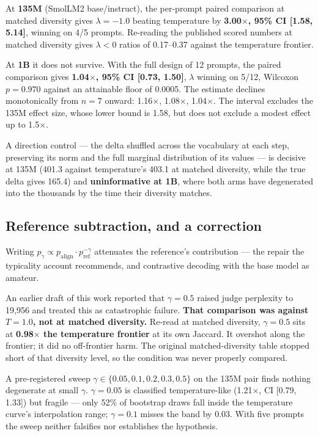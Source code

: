 \documentclass[11pt]{article}
\begin{document}
At \textbf{135M} (SmolLM2 base/instruct), the per-prompt paired comparison at
matched diversity gives $\lambda = -1.0$ beating temperature by
\textbf{3.00$\times$, 95\% CI [1.58, 5.14]}, winning on 4/5 prompts. Re-reading the
published scored numbers at matched diversity gives $\lambda < 0$ ratios of
0.17--0.37 against the temperature frontier.

At \textbf{1B} it does not survive. With the full design of 12 prompts, the paired
comparison gives \textbf{1.04$\times$, 95\% CI [0.73, 1.50]}, $\lambda$ winning on
5/12, Wilcoxon $p = 0.970$ against an attainable floor of 0.0005. The estimate
declines monotonically from $n = 7$ onward: 1.16$\times$, 1.08$\times$,
1.04$\times$. The interval excludes the 135M effect size, whose lower bound is
1.58, but does not exclude a modest effect up to 1.5$\times$.

A direction control --- the delta shuffled across the vocabulary at each step,
preserving its norm and the full marginal distribution of its values --- is
decisive at 135M (401.3 against temperature's 403.1 at matched diversity, while the
true delta gives 165.4) and \textbf{uninformative at 1B}, where both arms have
degenerated into the thousands by the time their diversity matches.

\subsection{Reference subtraction, and a correction}
\label{sec:refsub}

Writing $p_\gamma \propto p_{\mathrm{align}} \cdot p_{\mathrm{ref}}^{-\gamma}$
attenuates the reference's contribution --- the repair the typicality account
recommends, and contrastive decoding \cite{li2023} with the base model as amateur.

An earlier draft of this work reported that $\gamma = 0.5$ raised judge perplexity
to 19{,}956 and treated this as catastrophic failure. \textbf{That comparison was
against $T = 1.0$, not at matched diversity.} Re-read at matched diversity,
$\gamma = 0.5$ sits at \textbf{0.98$\times$ the temperature frontier} at its own
Jaccard. It overshot along the frontier; it did no off-frontier harm. The original
matched-diversity table stopped short of that diversity level, so the condition was
never properly compared.

A pre-registered sweep $\gamma \in \{0.05, 0.1, 0.2, 0.3, 0.5\}$ on the 135M pair
finds nothing degenerate at small $\gamma$. $\gamma = 0.05$ is classified
temperature-like (1.21$\times$, CI [0.79, 1.33]) but fragile --- only 52\% of
bootstrap draws fall inside the temperature curve's interpolation range;
$\gamma = 0.1$ misses the band by 0.03. With five prompts the sweep neither
falsifies nor establishes the hypothesis.
\end{document}
